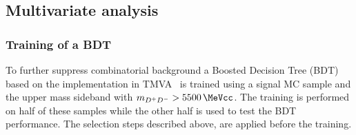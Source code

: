 \subsection{Multivariate analysis}
\label{sec:b02dd:selection:mva}

\subsubsection{Training of a BDT}
\label{sec:b02dd:selection:mva:training}

To further suppress combinatorial background a Boosted Decision Tree
(BDT)~\cite{Breiman,Roe} based on the implementation in
TMVA~\cite{Hocker:2007ht} is trained using a signal MC sample and the upper
mass sideband with $m_{\Dp\Dm} > \SI{5500}{\MeVcc}$. The training is performed
on half of these samples while the other half is used to test the BDT
performance. The selection steps described above, are applied before the
training.

